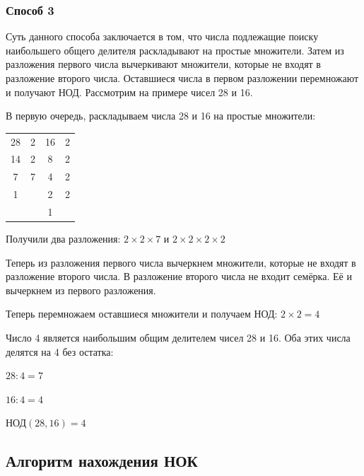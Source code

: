 \documentclass[12pt]{article}
\renewcommand{\gcd}{\text{НОД}}
\begin{document}
\subsubsection{Способ 3}
Суть данного способа заключается в том, что числа подлежащие поиску наибольшего общего делителя раскладывают на простые множители. Затем из разложения первого числа вычеркивают множители, которые не входят в разложение второго числа. Оставшиеся числа в первом разложении перемножают и получают НОД. Рассмотрим на примере чисел 28 и 16.\par
В первую очередь, раскладываем числа 28 и 16 на простые множители:\par
\begin{tabular}{c|cc|c}
    28 & 2 & 16 & 2 \\
    14 & 2 & 8  & 2 \\
    7  & 7 & 4  & 2 \\
    1  &   & 2  & 2 \\
       &   & 1
\end{tabular}\par
Получили два разложения: $2 \times 2 \times 7$ и $2 \times 2 \times 2 \times 2$\par
Теперь из разложения первого числа вычеркнем множители, которые не входят в разложение второго числа. В разложение второго числа не входит семёрка. Её и вычеркнем из первого разложения.\par
Теперь перемножаем оставшиеся множители и получаем НОД: $2 \times 2 = 4$\par
Число 4 является наибольшим общим делителем чисел 28 и 16. Оба этих числа делятся на 4 без остатка:\par
$28 : 4 = 7$\par
$16 : 4 = 4$\par
$\gcd(28,16)=4$\par

\subsection{Алгоритм нахождения НОК}
\end{document}
